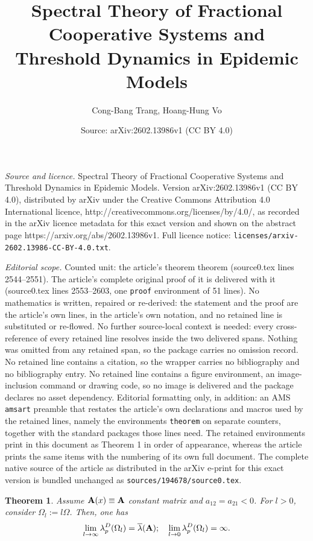 \documentclass[10pt,a4paper]{amsart}
\title{Spectral Theory of Fractional Cooperative Systems and Threshold Dynamics in Epidemic Models}
\author{Cong-Bang Trang, Hoang-Hung Vo}
\date{Source: arXiv:2602.13986v1 (CC BY 4.0)}
\newtheorem{theorem}{Theorem}
\def\O{\Omega}
\begin{document}
\maketitle

\noindent\emph{Source and licence.} Spectral Theory of Fractional Cooperative Systems and Threshold Dynamics in Epidemic Models. Version arXiv:2602.13986v1 (CC BY 4.0), distributed by arXiv under the Creative Commons Attribution 4.0 International licence, http://creativecommons.org/licenses/by/4.0/, as recorded in the arXiv licence metadata for this exact version and shown on the abstract page https://arxiv.org/abs/2602.13986v1. Full licence notice: \texttt{licenses/arxiv-2602.13986-CC-BY-4.0.txt}.\par\smallskip

\noindent\textit{Editorial scope.} Counted unit: the article's theorem theorem (source0.tex lines 2544--2551). The article's complete original proof of it is delivered with it (source0.tex lines 2553--2603, one \texttt{proof} environment of 51 lines). No mathematics is written, repaired or re-derived: the statement and the proof are the article's own lines, in the article's own notation, and no retained line is substituted or re-flowed.  No further source-local context is needed: every cross-reference of every retained line resolves inside the two delivered spans.  Nothing was omitted from any retained span, so the package carries no omission record.  No retained line contains a citation, so the wrapper carries no bibliography and no bibliography entry.  No retained line contains a figure environment, an image-inclusion command or drawing code, so no image is delivered and the package declares no asset dependency.  Editorial formatting only, in addition: an AMS \texttt{amsart} preamble that restates the article's own declarations and macros used by the retained lines, namely the environments \texttt{theorem} on separate counters, together with the standard packages those lines need.  The retained environments print in this document as Theorem 1 in order of appearance, whereas the article prints the same items with the numbering of its own full document.  The complete native source of the article as distributed in the arXiv e-print for this exact version is bundled unchanged as \texttt{sources/194678/source0.tex}.
\begin{theorem}
Assume  ${\bf A}(x)\equiv {\bf A}$ constant matrix and $a_{12}=a_{21}<0$. For $l>0$, consider $\O_{l}:=l\O$. Then, one has
\begin{align*}
\lim_{l \rightarrow \infty}\lambda^D_p(\O_l)=\overline{\lambda}({\bf A});\quad \lim_{l \rightarrow 0}\lambda^D_p(\O_l)=\infty.
\end{align*}


\end{theorem}
\end{document}

